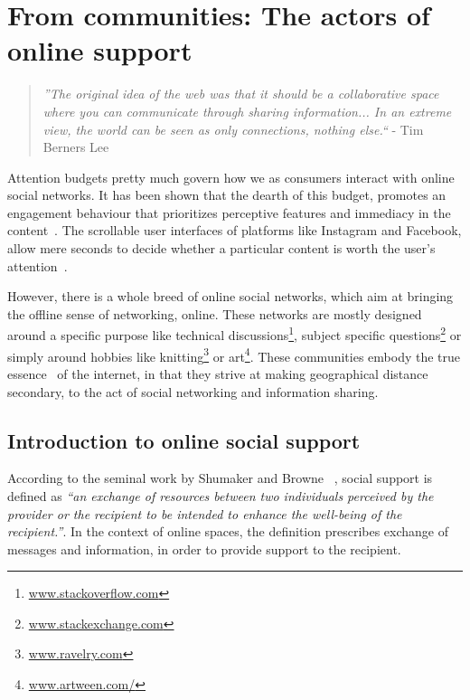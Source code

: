 
\chapter{From communities: The actors of online support }

\label{chap:Utility_support}
\graphicspath{{Chapter2/plots/} {Chapter2/plots}}
\begin{quote}
    \textit{''The original idea of the web was that it should be a collaborative space where you can communicate through sharing information... In an extreme view, the world can be seen as only connections, nothing else.``} - Tim Berners Lee\cite{berners2001weaving} 
\end{quote}
Attention budgets pretty much govern how we as consumers interact with online social networks. It has been shown that the dearth of this budget, promotes an engagement behaviour that prioritizes perceptive features and immediacy in the content~\cite{joglekar2017like}. The scrollable user interfaces of platforms like Instagram and Facebook, allow mere seconds to decide whether a particular content is worth the user's attention~\cite{eikelboom2017irresistible}. 

However, there is a whole breed of online social networks, which aim at bringing the offline sense of networking, online. These networks are mostly designed around a specific purpose like technical discussions\footnote{\url{www.stackoverflow.com}}, subject specific questions\footnote{\url{www.stackexchange.com}} or simply around hobbies like knitting\footnote{\url{www.ravelry.com}} or art\footnote{\url{www.artween.com/}}. These communities embody the true essence~\cite{berners2001weaving} of the internet, in that they strive at making geographical distance secondary, to the act of social networking and information sharing.

\section{Introduction to online social support}

According to the seminal work by Shumaker and Browne ~\cite{shumaker1984toward}, social support is defined as \textsl{``an exchange of resources between two individuals perceived by the provider or the recipient to be intended to enhance the well-being of the recipient.''}. In the context of online spaces, the definition prescribes exchange of messages and information, in order to provide support to the recipient.  

